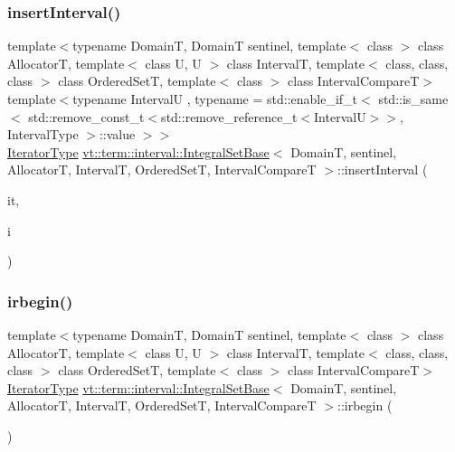 \subsubsection{\texorpdfstring{insert\+Interval()}{insertInterval()}\hspace{0.1cm}{\footnotesize\ttfamily [2/2]}}
{\footnotesize\ttfamily template$<$typename DomainT, DomainT sentinel, template$<$ class $>$ class AllocatorT, template$<$ class U, U $>$ class IntervalT, template$<$ class, class, class $>$ class Ordered\+SetT, template$<$ class $>$ class Interval\+CompareT$>$ \\
template$<$typename IntervalU , typename  = std\+::enable\+\_\+if\+\_\+t$<$      std\+::is\+\_\+same$<$        std\+::remove\+\_\+const\+\_\+t$<$std\+::remove\+\_\+reference\+\_\+t$<$\+Interval\+U$>$$>$, Interval\+Type      $>$\+::value    $>$$>$ \\
\hyperlink{structvt_1_1term_1_1interval_1_1_integral_set_base_a111b2ec1ea960a40ba4270be702f11f1}{Iterator\+Type} \hyperlink{structvt_1_1term_1_1interval_1_1_integral_set_base}{vt\+::term\+::interval\+::\+Integral\+Set\+Base}$<$ DomainT, sentinel, AllocatorT, IntervalT, Ordered\+SetT, Interval\+CompareT $>$\+::insert\+Interval (\begin{DoxyParamCaption}\item[{\hyperlink{structvt_1_1term_1_1interval_1_1_integral_set_base_a111b2ec1ea960a40ba4270be702f11f1}{Iterator\+Type}}]{it,  }\item[{IntervalU \&\&}]{i }\end{DoxyParamCaption})\hspace{0.3cm}{\ttfamily [inline]}}

\mbox{\label{structvt_1_1term_1_1interval_1_1_integral_set_base_a07c43cee06c7e1f943f4acfd1274e8c1}} 
\subsubsection{\texorpdfstring{irbegin()}{irbegin()}}
{\footnotesize\ttfamily template$<$typename DomainT, DomainT sentinel, template$<$ class $>$ class AllocatorT, template$<$ class U, U $>$ class IntervalT, template$<$ class, class, class $>$ class Ordered\+SetT, template$<$ class $>$ class Interval\+CompareT$>$ \\
\hyperlink{structvt_1_1term_1_1interval_1_1_integral_set_base_a111b2ec1ea960a40ba4270be702f11f1}{Iterator\+Type} \hyperlink{structvt_1_1term_1_1interval_1_1_integral_set_base}{vt\+::term\+::interval\+::\+Integral\+Set\+Base}$<$ DomainT, sentinel, AllocatorT, IntervalT, Ordered\+SetT, Interval\+CompareT $>$\+::irbegin (\begin{DoxyParamCaption}{ }\end{DoxyParamCaption})\hspace{0.3cm}{\ttfamily [inline]}}

